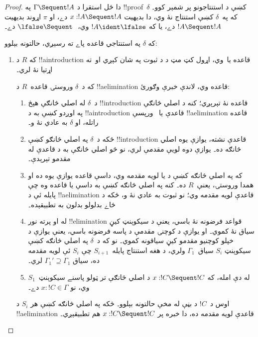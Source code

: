 \documentclass[../../../include/open-logic-section]{subfiles}
\begin{document}
\begin{proof}
دا ځل استقرا د $\Gamma \Sequent !A$ په !!{proof}~$\delta$
کښې د استنتاجونو پر شمېر کوو۔ که په~$\delta$ کښې استنتاج
نۀ وي، دا بديهيت $x:!A \Sequent !A$ دے، او $\pi$ اړوند
بديهيت $!A \Sequent !A$ دے، يا که $!A \ident \lfalse$
وي، $\lfalse \Sequent \ $ دے۔

که $\delta$ په استنتاجي قاعده پاے ته رسېږي، حالتونه بېلوو:
\begin{enumerate}
  \item که $R$ د !!a{introduction} قاعده يا~\FalseInt وي،
  اړول کټ مټ د  د ثبوت په
  شان کېږي او~\Cut ته اړتيا نۀ لري۔

  که د~$\delta$ وروستۍ قاعده~$R$ د !!a{elimination}
  قاعده وي، لاندې خبرې وګورئ:
  \begin{enumerate}
    \item د~$\delta$ له اصلي څانګې هېڅ !!{introduction}
    قاعده نۀ تېرېږي؛ کنه د اصلي څانګې په اوږدو کښې به د
    !!a{introduction} قاعدې يا~\FalseInt{} ورپسې
    !!a{elimination} قاعده راتله، او $\delta$ به عادي نۀ و۔
    \item ځکه د~$\delta$ په اصلي څانګو کښې
    !!{introduction} قاعدې نشته، يوازې يوه اصلي څانګه ده۔
    يوازې \Intro{\land} دوه لويې مقدمې لري، نو څو اصلي
    څانګې به د \Intro{\land} قاعدې له مقدمو تېرېدې۔
    \item که په اصلي څانګه کښې د \Elim{\lor} يا
    \Elim{\lexists} لويه مقدمه وي، داسې قاعده يوازې يوه ده
    او همدا وروستۍ، يعنې~$R$ ده۔ کنه په اصلي څانګه کښې به
    داسې \Elim{\lor} يا \Elim{\lexists} قاعده وه چې پايله
    ئې د !!a{elimination} قاعدې لويه مقدمه وي؛ نو ثبوت به
    عادي نۀ و، ځکه د ځاے بدلولو بدلون به تطبيقېده۔
    \item له \Elim{\lor} او \Elim{\lexists} پرته نور
    !!{elimination} قواعد فرضونه نۀ باسي، يعنې د سيکوېنټ
    کيڼ سياق نۀ کموي۔ \Elim{\lor} او \Elim{\lexists}
    يوازې د کوچنۍ مقدمې د پاسه فرضونه باسي، يعنې يوازې د
    خپلو کوچنيو مقدمو کيڼ سياقونه کموي۔ نو که د~$\delta$
    په اصلي څانګه کښې سيکوېنټ $S_i$ سياق~$\Gamma_1$ ولري،
    د هغه استنتاج پايله~$S_{i+1}$ چې $S_i$ ئې لويه مقدمه
    ده، سياق $\Gamma_1' \supseteq \Gamma_1$ لري۔
    \item له دې امله، که $x: !C \Sequent !C$ د اصلي
    څانګې تر ټولو پاسنے سيکوېنټ~$S_1$ وي، نو
    $x:!C \in \Gamma$ دے۔
  \end{enumerate}
  اوس د~$!C$ د بڼې له مخې حالتونه بېلوو۔ ځکه په اصلي
  څانګه کښې هر $S_i$ د !!a{elimination} قاعدې لويه مقدمه
  ده، دا خبره پر $x:!C \Sequent !C$ هم تطبيقېږي۔


\end{enumerate}
\end{proof}
\end{document}
